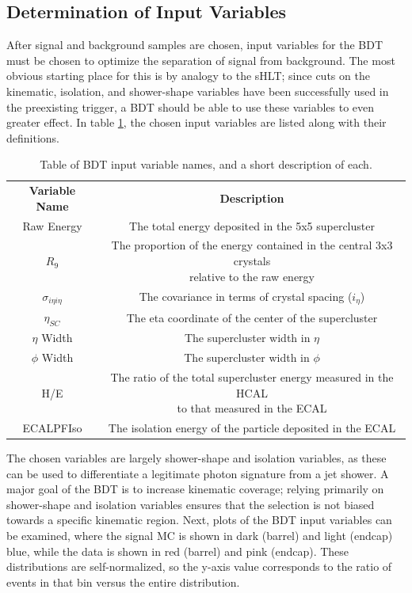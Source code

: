 \documentclass[12pt]{ucsddissertation}
\begin{document}
\subsection{Determination of Input Variables}
After signal and background samples are chosen, input variables for the BDT must be chosen to optimize the separation of signal from background. The most obvious starting place for this is by analogy to the sHLT; since cuts on the kinematic, isolation, and shower-shape variables have been successfully used in the preexisting trigger, a BDT should be able to use these variables to even greater effect. In table \ref{tab:HLTInputVars}, the chosen input variables are listed along with their definitions.
\begin{table}
	\centering
	\caption{Table of BDT input variable names, and a short description of each.}
	\label{tab:HLTInputVars}
	\begin{tabular}{ | c | c | } 
		\hline
		\textbf{Variable Name} & \textbf{Description} \\
		\Xhline{2pt}
	  	Raw Energy & The total energy deposited in the 5x5 supercluster  \\ 
		\hline
		$R_{9}$ & \makecell{The proportion of the energy contained in the central 3x3 crystals \\ relative to the raw energy}  \\ 
		\hline
		$\sigma_{i \eta i \eta}$ & The covariance in terms of crystal spacing ($i_{\eta}$)\\ 
		\hline
		$\eta_{SC}$ & The eta coordinate of the center of the supercluster  \\ 
		\hline
		$\eta$ Width &  The supercluster width in $\eta$ \\ 
		\hline
		$\phi$ Width &  The supercluster width in $\phi$ \\ 
		\hline
		H/E & \makecell{The ratio of the total supercluster energy measured in the HCAL \\ to that measured in the ECAL}  \\ 
		\hline
		ECALPFIso & The isolation energy of the particle deposited in the ECAL\\ 
		\hline
	\end{tabular}
\end{table}

The chosen variables are largely shower-shape and isolation variables, as these can be used to differentiate a legitimate photon signature from a jet shower. A major goal of the BDT is to increase kinematic coverage; relying primarily on shower-shape and isolation variables ensures that the selection is not biased towards a specific kinematic region. Next, plots of the BDT input variables can be examined, where the signal MC is shown in dark (barrel) and light (endcap) blue, while the data is shown in red (barrel) and pink (endcap). These distributions are self-normalized, so the y-axis value corresponds to the ratio of events in that bin versus the entire distribution.
\end{document}
